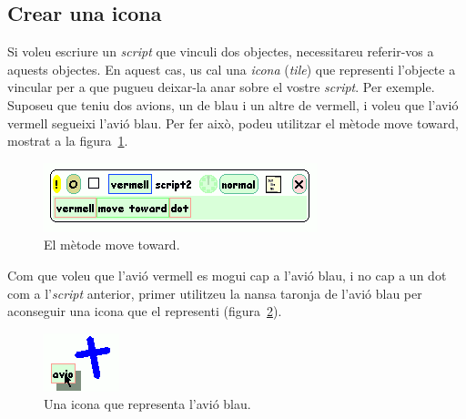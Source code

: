\subsection{Crear una icona}
Si voleu escriure un \emph{script} que vinculi dos objectes, necessitareu referir-vos a aquests objectes. En aquest cas, us cal una \emph{icona} (\emph{tile}) que representi l'objecte a vincular per a que pugueu deixar-la anar sobre el vostre \emph{script}. Per exemple. Suposeu que teniu dos avions, un de blau i un altre de vermell, i voleu que l'avió vermell segueixi l'avió blau. Per fer això, podeu utilitzar el mètode \textsf{move toward}, mostrat a la figura~\ref{fig2450}.
\begin{figure}[h!]
\begin{center}
\includegraphics[scale=0.6]{Imatges/figura24-50}
\end{center}
\caption{El mètode \textsf{\upshape move toward}.}
\label{fig2450}
\end{figure}

Com que voleu que l'avió vermell es mogui cap a l'avió blau, i no cap a un \textsf{dot} com a l'\emph{script} anterior, primer utilitzeu la nansa taronja de l'avió blau per aconseguir una icona que el representi (figura~\ref{fig2451}).
\begin{figure}[h!]
\begin{center}
\includegraphics[scale=0.8]{Imatges/figura24-51}
\end{center}
\caption{Una icona que representa l'avió blau.}
\label{fig2451}
\end{figure}

